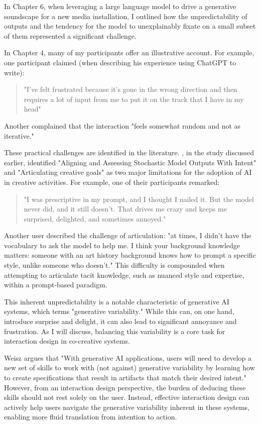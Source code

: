 In Chapter 6, when leveraging a large language model to drive a generative soundscape for a new media installation, I outlined how the unpredictability of outputs and the tendency for the model to unexplainably fixate on a small subset of them represented a significant challenge.

In Chapter 4, many of my participants offer an illustrative account. For example, one participant claimed (when describing his experience using ChatGPT to write):

\begin{quote}
    "I've felt frustrated because it's gone in the wrong direction and then requires a lot of input from me to put it on the track that I have in my head"
\end{quote}

Another complained that the interaction "feels somewhat random and not as iterative."

These practical challenges are identified in the literature. \cite{Palani2024-on}, in the study discussed earlier, identified "Aligning and Assessing Stochastic Model Outputs With Intent" and "Articulating creative goals" as two major limitations for the adoption of AI in creative activities. For example, one of their participants remarked:
\begin{quote}
"I was prescriptive in my prompt, and I thought I nailed it. But the model never did, and it still doesn't. That drives me crazy and keeps me surprised, delighted, and sometimes annoyed."
\end{quote}
Another user described the challenge of articulation: "at times, I didn't have the vocabulary to ask the model to help me. I think your background knowledge matters: someone with an art history background knows how to prompt a specific style, unlike someone who doesn't." This difficulty is compounded when attempting to articulate tacit knowledge, such as nuanced style and expertise, within a prompt-based paradigm.

This inherent unpredictability is a notable characteristic of generative AI systems, which \cite{Weisz2024-io} terms "generative variability." While this can, on one hand, introduce surprise and delight, it can also lead to significant annoyance and frustration. As I will discuss, balancing this variability is a core task for interaction design in co-creative systems.

Weisz argues that "With generative AI applications, users will need to develop a new set of skills to work with (not against) generative variability by learning how to create specifications that result in artifacts that match their desired intent." However, from an interaction design perspective, the burden of deducing these skills should not rest solely on the user. Instead, effective interaction design can actively help users navigate the generative variability inherent in these systems, enabling more fluid translation from intention to action.

